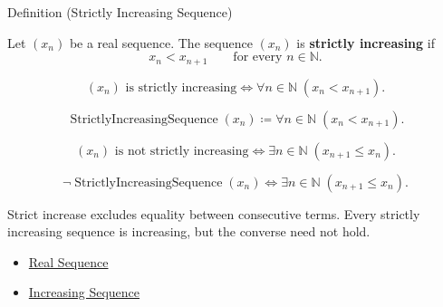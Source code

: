 
\begin{definitionbox}{Definition (Strictly Increasing Sequence)}
\begin{definition}
\label{def:strictly-increasing-sequence}
Let $(x_n)$ be a real sequence. The sequence $(x_n)$ is
\textbf{strictly increasing} if
\[
  x_n < x_{n+1}
  \qquad
  \text{for every } n\in\mathbb{N}.
\]
\end{definition}
\end{definitionbox}

\begin{remark*}
\[
(x_n)\text{ is strictly increasing}
\Longleftrightarrow
\forall n\in\mathbb{N}\;(x_n<x_{n+1}).
\]
\end{remark*}

\begin{remark*}
\[
\operatorname{StrictlyIncreasingSequence}(x_n)
\coloneqq
\forall n\in\mathbb{N}\;(x_n<x_{n+1}).
\]
\end{remark*}

\begin{remark*}
\[
(x_n)\text{ is not strictly increasing}
\Longleftrightarrow
\exists n\in\mathbb{N}\;(x_{n+1}\le x_n).
\]
\end{remark*}

\begin{remark*}
\[
\neg\operatorname{StrictlyIncreasingSequence}(x_n)
\Longleftrightarrow
\exists n\in\mathbb{N}\;(x_{n+1}\le x_n).
\]
\end{remark*}

\begin{remark*}[Interpretation]
Strict increase excludes equality between consecutive terms. Every strictly
increasing sequence is increasing, but the converse need not hold.
\end{remark*}

\begin{dependencies}
\begin{itemize}
  \item \hyperref[def:real-sequence]{Real Sequence}
  \item \hyperref[def:increasing-sequence]{Increasing Sequence}
\end{itemize}
\end{dependencies}

